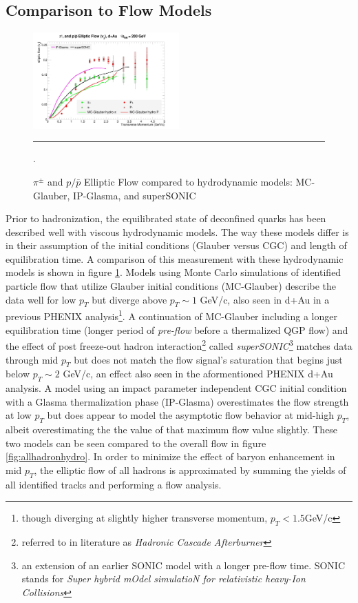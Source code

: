 \subsection{Comparison to Flow Models}
\begin{figure}[hbtp]
\centering    
    \includegraphics[width=0.5\textwidth]{results/v2allpipmodels.jpg}
    \rule{35em}{0.5pt}
    \caption[$\pi^{\pm}$ and $p/\bar{p}$ Elliptic Flow compared to hydrodynamic models.]{$\pi^{\pm}$ and $p/\bar{p}$ Elliptic Flow compared to hydrodynamic models: MC-Glauber\citep{Nagle:2013lja}, IP-Glasma\citep{Schenke:2014gaa}, and superSONIC\citep{Romatschke2015}}.
    \label{fig:hydrov2}
\end{figure}

Prior to hadronization, the equilibrated state of deconfined quarks has been described well with viscous hydrodynamic models. The way these models differ is in their assumption of the initial conditions (Glauber versus CGC) and length of equilibration time. A comparison of this measurement with these hydrodynamic models is shown in figure \ref{fig:hydrov2}. Models using Monte Carlo simulations of identified particle flow that utilize Glauber initial conditions (MC-Glauber) describe the data well for low $p_T$ but diverge above $p_T \sim 1$ GeV/c, also seen in d+Au in a previous PHENIX analysis\citep{Adare:2014keg}\footnote{though diverging at slightly higher transverse momentum, $p_T < 1.5 $GeV/c}. A continuation of MC-Glauber including a longer equilibration time (longer period of \textit{pre-flow} before a thermalized QGP flow) and the effect of post freeze-out hadron interaction\footnote{referred to in literature as \textit{Hadronic Cascade Afterburner}} called \textit{superSONIC}\citep{Romatschke2015}\footnote{an extension of an earlier SONIC model with a longer pre-flow time. SONIC stands for \textit{Super hybrid mOdel simulatioN for relativistic heavy-Ion Collisions}\citep{Romatschke2015}} matches data through mid $p_T$ but does not match the flow signal's saturation that begins just below $p_T \sim 2$ GeV/c, an effect also seen in the aformentioned PHENIX d+Au analysis. A model using an impact parameter independent CGC initial condition with a Glasma thermalization phase (IP-Glasma)\citep{Schenke:2014gaa} overestimates the flow strength at low $p_T$ but does appear to model the asymptotic flow behavior at mid-high $p_T$, albeit overestimating the the value of that maximum flow value slightly. These two models can be seen compared to the overall flow in figure \ref{fig:allhadronhydro}. In order to minimize the effect of baryon enhancement in mid $p_T$, the elliptic flow of all hadrons is approximated by summing the yields of all identified tracks and performing a flow analysis. 

